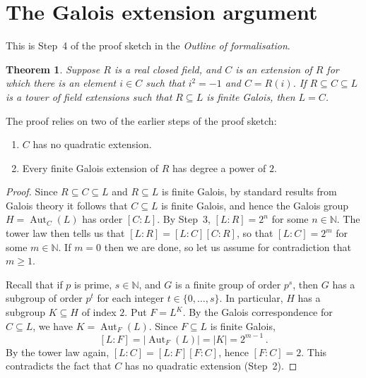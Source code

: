 \documentclass{article}
\newtheorem{theorem}{Theorem}
\DeclareMathOperator{\Aut}{Aut}
\begin{document}
\section*{The Galois extension argument}
This is Step~4 of the proof sketch in the \emph{Outline of formalisation}.
\begin{theorem}\label{thm:galois-extension}
Suppose $R$ is a real closed field, and $C$ is an extension of $R$ for which
there is an element $i\in C$ such that $i^2=-1$ and $C=R(i)$. If $R\subseteq
C\subseteq L$ is a tower of field extensions such that $R\subseteq L$ is finite
Galois, then $L=C$.
\end{theorem}
The proof relies on two of the earlier steps of the proof sketch:
\begin{enumerate}[label=\textbf{Step \arabic*.}, start=2, leftmargin=*]
\item $C$ has no quadratic extension.
\item Every finite Galois extension of $R$ has degree a power of $2$.
\end{enumerate}
\begin{proof}
Since $R\subseteq C\subseteq L$ and $R\subseteq L$ is finite Galois, by standard
results from Galois theory it follows that $C\subseteq L$ is finite Galois, and
hence the Galois group $H=\Aut_{C}(L)$ has order $[C:L]$. By Step~3, $[L:R]=2^n$
for some $n\in\mathbb N$. The tower law then tells us that $[L:R]=[L:C][C:R]$,
so that $[L:C]=2^m$ for some $m\in\mathbb N$. If $m=0$ then we are done, so let
us assume for contradiction that $m\ge 1$. 

Recall that if $p$ is prime, $s\in\mathbb N$, and $G$ is a finite group of order $p^s$, then $G$
has a subgroup of order $p^t$ for each integer $t\in\{0,\dots,s\}$. In
particular, $H$ has a subgroup $K\subseteq H$ of index $2$. Put $F=L^K$. By
the Galois correspondence for $C\subseteq L$, we have $K=\Aut_F(L)$. Since
$F\subseteq L$ is finite Galois,
$$
[L:F]=|\Aut_F(L)|=|K|=2^{m-1} \, .
$$
By the tower law again, $[L:C]=[L:F][F:C]$, hence $[F:C]=2$. This contradicts
the fact that $C$ has no quadratic extension (Step~2).
\end{proof}
\end{document}
